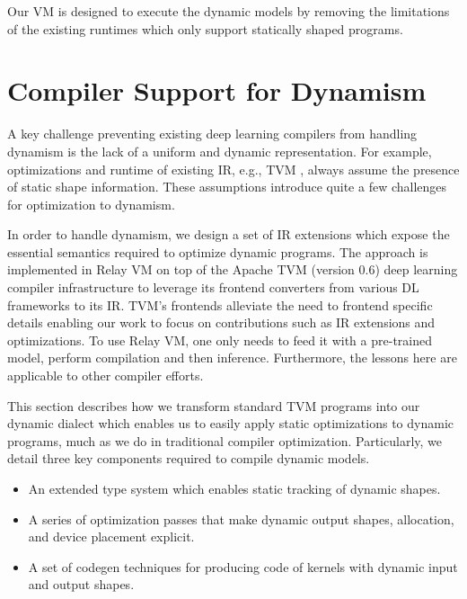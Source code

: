 Our VM is designed to execute the dynamic models by removing the limitations of the existing runtimes which only support statically shaped programs.

\section{Compiler Support for Dynamism}
\label{sec:compliation}

A key challenge preventing existing deep learning compilers from handling dynamism is the lack of a uniform and dynamic representation. For example, optimizations and runtime of existing IR, e.g., TVM \citep{tvm_osdi18}, always assume the presence of static shape information. These assumptions introduce quite a few challenges for optimization to dynamism.

In order to handle dynamism, we design a set of IR extensions which expose the essential semantics required to optimize dynamic programs. The approach is implemented in Relay VM on top of the Apache TVM (version 0.6) deep learning compiler infrastructure \citep{tvm_osdi18} to leverage its frontend converters from various DL frameworks to its IR. TVM's frontends alleviate the need to frontend specific details enabling our work to focus on contributions such as IR extensions and optimizations. To use Relay VM, one only needs to feed it with a pre-trained model, perform compilation and then inference. Furthermore, the lessons
here are applicable to other compiler efforts.

This section describes how we transform standard TVM programs into our dynamic dialect which enables us to easily apply static optimizations to dynamic programs, much as we do in traditional compiler optimization. Particularly, we detail three key components required to compile dynamic models.

\begin{itemize}
    \item An extended type system which enables static tracking of dynamic shapes.
    \item A series of optimization passes that make dynamic output shapes, allocation, and device placement explicit.
    \item A set of codegen techniques for producing code of kernels with dynamic input and output shapes.
\end{itemize}


